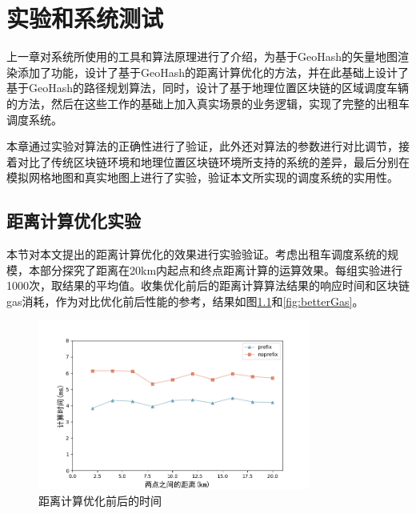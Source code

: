 \chapter{实验和系统测试}
上一章对系统所使用的工具和算法原理进行了介绍，为基于GeoHash的矢量地图渲染添加了功能，设计了基于GeoHash的距离计算优化的方法，并在此基础上设计了基于GeoHash的路径规划算法，同时，设计了基于地理位置区块链的区域调度车辆的方法，然后在这些工作的基础上加入真实场景的业务逻辑，实现了完整的出租车调度系统。

本章通过实验对算法的正确性进行了验证，此外还对算法的参数进行对比调节，接着对比了传统区块链环境和地理位置区块链环境所支持的系统的差异，最后分别在模拟网格地图和真实地图上进行了实验，验证本文所实现的调度系统的实用性。




\section{距离计算优化实验}
本节对本文提出的距离计算优化的效果进行实验验证。考虑出租车调度系统的规模，本部分探究了距离在20km内起点和终点距离计算的运算效果。每组实验进行1000次，取结果的平均值。收集优化前后的距离计算算法结果的响应时间和区块链gas消耗，作为对比优化前后性能的参考，结果如图\ref{fig:betterDistance}和\ref{fig:betterGas}。

\begin{figure}[h]
  \centering
  \includegraphics[height=0.3\textheight,width=0.8\textwidth]{figures/距离计算优化时间}
  \caption{距离计算优化前后的时间}\label{fig:betterDistance}
\end{figure}

